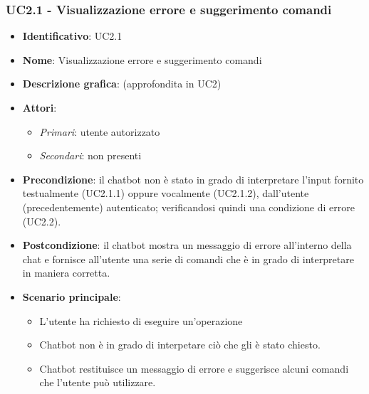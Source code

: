 \subsubsection{UC2.1 - Visualizzazione errore e suggerimento comandi}
\begin{itemize}
    \item \textbf{Identificativo}: UC2.1
    \item \textbf{Nome}: Visualizzazione errore e suggerimento comandi
    \item \textbf{Descrizione grafica}: (approfondita in UC2)
    \item \textbf{Attori}:
    \begin{itemize} 
        \item \textit{Primari}: utente autorizzato
        \item \textit{Secondari}: non presenti
    \end{itemize}
        \item \textbf{Precondizione}: il chatbot non è stato in grado di interpretare l'input fornito testualmente (UC2.1.1) oppure vocalmente (UC2.1.2), dall'utente (precedentemente) autenticato; verificandosi quindi una condizione di errore (UC2.2).
        \item \textbf{Postcondizione}: il chatbot mostra un messaggio di errore all'interno della chat e fornisce all'utente una serie di comandi che è in grado di interpretare in maniera corretta. 
     \item \textbf{Scenario principale}: 
        \begin{itemize}
            \item L'utente ha richiesto di eseguire un'operazione
            \item Chatbot non è in grado di interpetare ciò che gli è stato chiesto.
            \item Chatbot restituisce un messaggio di errore e suggerisce alcuni comandi che l'utente può utilizzare.
        \end{itemize}
\end{itemize}

